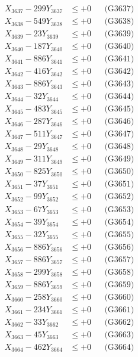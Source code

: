 \documentclass[a4paper,10pt]{article}
\begin{document}
{\begin{align}
X_{3637} - 299Y_{3637} &\leq +0 && \text{(G3637)} \\
X_{3638} - 549Y_{3638} &\leq +0 && \text{(G3638)} \\
X_{3639} - 23Y_{3639} &\leq +0 && \text{(G3639)} \\
X_{3640} - 187Y_{3640} &\leq +0 && \text{(G3640)} \\
\allowbreak
X_{3641} - 886Y_{3641} &\leq +0 && \text{(G3641)} \\
X_{3642} - 416Y_{3642} &\leq +0 && \text{(G3642)} \\
X_{3643} - 886Y_{3643} &\leq +0 && \text{(G3643)} \\
X_{3644} - 32Y_{3644} &\leq +0 && \text{(G3644)} \\
X_{3645} - 483Y_{3645} &\leq +0 && \text{(G3645)} \\
X_{3646} - 287Y_{3646} &\leq +0 && \text{(G3646)} \\
X_{3647} - 511Y_{3647} &\leq +0 && \text{(G3647)} \\
X_{3648} - 29Y_{3648} &\leq +0 && \text{(G3648)} \\
X_{3649} - 311Y_{3649} &\leq +0 && \text{(G3649)} \\
X_{3650} - 825Y_{3650} &\leq +0 && \text{(G3650)} \\
\allowbreak
X_{3651} - 37Y_{3651} &\leq +0 && \text{(G3651)} \\
X_{3652} - 99Y_{3652} &\leq +0 && \text{(G3652)} \\
X_{3653} - 67Y_{3653} &\leq +0 && \text{(G3653)} \\
X_{3654} - 39Y_{3654} &\leq +0 && \text{(G3654)} \\
X_{3655} - 32Y_{3655} &\leq +0 && \text{(G3655)} \\
X_{3656} - 886Y_{3656} &\leq +0 && \text{(G3656)} \\
X_{3657} - 886Y_{3657} &\leq +0 && \text{(G3657)} \\
X_{3658} - 299Y_{3658} &\leq +0 && \text{(G3658)} \\
X_{3659} - 886Y_{3659} &\leq +0 && \text{(G3659)} \\
X_{3660} - 258Y_{3660} &\leq +0 && \text{(G3660)} \\
\allowbreak
X_{3661} - 234Y_{3661} &\leq +0 && \text{(G3661)} \\
X_{3662} - 33Y_{3662} &\leq +0 && \text{(G3662)} \\
X_{3663} - 45Y_{3663} &\leq +0 && \text{(G3663)} \\
X_{3664} - 462Y_{3664} &\leq +0 && \text{(G3664)} \\

\end{align}}
\end{document}
